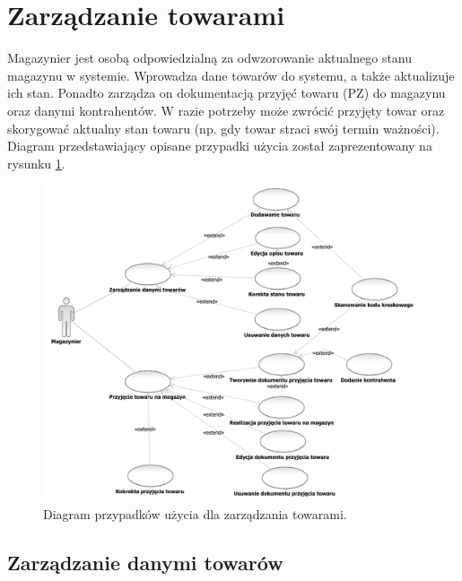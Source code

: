 \section{Zarządzanie towarami}
Magazynier jest osobą odpowiedzialną za odwzorowanie aktualnego stanu
magazynu w systemie. Wprowadza dane towarów do systemu, a także
aktualizuje ich stan. Ponadto zarządza on dokumentacją przyjęć towaru (PZ) do
magazynu oraz danymi kontrahentów. W razie potrzeby może zwrócić
przyjęty towar oraz skorygować aktualny stan towaru 
(np. gdy towar straci swój termin ważności). Diagram przedstawiający opisane przypadki użycia
został zaprezentowany na rysunku \ref{fig:ZarzadzanieTowarami}.

\begin{figure}[H]
  \centering
  \includegraphics[scale=0.6]{../img/usecase/ZarzadzanieTowarami.pdf}
  \caption{Diagram przypadków użycia dla zarządzania towarami.}
  \label{fig:ZarzadzanieTowarami}
\end{figure}

\newpage
\singlespacing
\subsection{Zarządzanie danymi towarów}

\begin{usecase}
\end{usecase}

